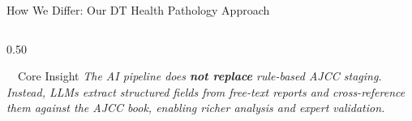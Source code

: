 \documentclass[aspectratio=169, 10pt]{beamer}
\begin{document}
\begin{frame}{How We Differ: Our DT Health Pathology Approach}
\begin{columns}[T]
\begin{column}{0.50\textwidth}
\begin{alertblock}{\faLightbulb\ \ Core Insight}
\footnotesize
\textit{The AI pipeline does \textbf{not replace} rule-based AJCC staging. Instead, LLMs extract structured fields from free-text reports and cross-reference them against the AJCC book, enabling richer analysis and expert validation.}
\end{alertblock}

\end{column}
\end{columns}

\end{frame}
\end{document}
